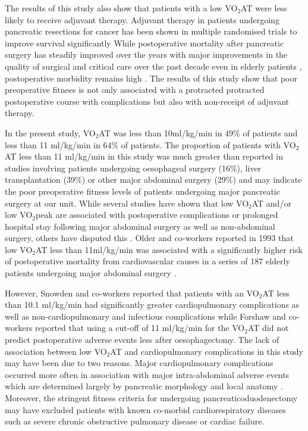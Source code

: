 The results of this study also show that patients with a low VO$_2$AT were less likely to receive adjuvant therapy. 
Adjuvant therapy in patients undergoing pancreatic resections for cancer has been shown in multiple randomised trials to improve survival significantly \parencite{neoptolemos_randomized_2004, neoptolemos_adjuvant_2009}
While postoperative mortality after pancreatic surgery has steadily improved over the years with major improvements in the quality of surgical and critical care over the past decade \parencite{winter_1423_2006} even in elderly patients \parencite{makary_pancreaticoduodenectomy_2006}, postoperative morbidity remains high \parencite{mann_review_2010}. 
The results of this study show that poor preoperative fitnees is not only associated with a protracted protracted postoperative course with complications but also with non-receipt of adjuvant therapy.

In the present study, VO$_2$AT was less than 10ml/kg/min in 49\% of patients and less than 11 ml/kg/min in 64\% of patients. 
The proportion of patients with VO$_2$AT less than 11 ml/kg/min in this study was much greater than reported in studies involving patients undergoing oesophageal surgery (16\%),\parencite{forshaw_is_2008} liver transplantation (39\%)\parencite{epstein_aerobic_2004} or other major abdominal surgery (29\%)\parencite{older_preoperative_1993} and may indicate the poor preoperative fitness levels of patients undergoing major pancreatic surgery at our unit. 
While several studies have shown that low VO$_2$AT and/or low VO$_2$peak are associated with postoperative complications or prolonged hospital stay following major abdominal surgery as well as non-abdominal surgery,\parencite{older_preoperative_1993, epstein_aerobic_2004, mccullough_cardiorespiratory_2006, nagamatsu_preoperative_2001, older_cardiopulmonary_1999, older_clinical_2004} others have disputed this \parencite{forshaw_is_2008, clayton_cardiopulmonary_2011, hightower_pilot_2010}. 
Older and co-workers reported in 1993 that low VO$_2$AT less than 11ml/kg/min was associated with a significantly higher risk of postoperative mortality from cardiovascular causes in a series of 187 elderly patients undergoing major abdominal surgery \parencite{older_preoperative_1993}.

However, Snowden and co-workers \parencite{snowden_submaximal_2010} reported that patients with an VO$_2$AT less than 10.1 ml/kg/min had significantly greater cardiopulmonary complications as well as non-cardiopulmonary and infectious complications while Forshaw and co-workers \parencite{forshaw_is_2008} reported that using a cut-off of 11 ml/kg/min for the VO$_2$AT did not predict postoperative adverse events less after oesophagectomy. 
The lack of association between low VO$_2$AT and cardiopulmonary complications in this study may have been due to two reasons. 
Major cardiopulmonary complications occurred more often in association with major intra-abdominal adverse events which are determined largely by pancreatic morphology and local anatomy \parencite{braga_prognostic_2011}. 
Moreover, the stringent fitness criteria for undergoing pancreaticoduodenectomy may have excluded patients with known co-morbid cardiorespiratory diseases such as severe chronic obstructive pulmonary disease or cardiac failure.

